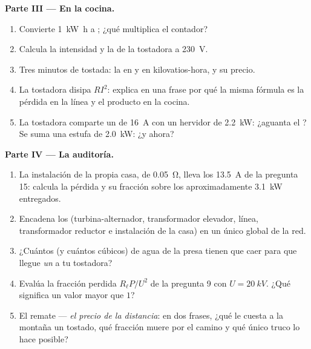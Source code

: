 \begin{problem}
\medskip
\noindent\textbf{Parte III --- En la cocina.}
\begin{enumerate}[resume]
  \item Convierte \qty{1}{kW.h} a ; ¿qué multiplica el contador?
  \item Calcula la intensidad y la  de la tostadora a
        \qty{230}{V}.
  \item Tres minutos de tostada: la  en  y en
        kilovatios-hora, y su precio.
  \item La tostadora disipa $RI^2$: explica en una frase por qué la
        misma fórmula es la pérdida en la línea y el producto en la
        cocina.
  \item La tostadora comparte un  de \qty{16}{A} con un hervidor
        de \qty{2.2}{kW}: ¿aguanta el ? Se suma una estufa de
        \qty{2.0}{kW}: ¿y ahora?
\end{enumerate}

\medskip
\noindent\textbf{Parte IV --- La auditoría.}
\begin{enumerate}[resume]
  \item La instalación de la propia casa, de 
        \qty{0.05}{\ohm}, lleva los \qty{13.5}{A} de la pregunta 15:
        calcula la pérdida y su fracción sobre los aproximadamente
        \qty{3.1}{kW} entregados.
  \item Encadena los  (turbina-alternador, transformador
        elevador, línea, transformador reductor e instalación de la
        casa) en un único  global de la red.
  \item ¿Cuántos  (y cuántos  cúbicos) de agua de la
        presa tienen que caer para que llegue \emph{un}  a
        tu tostadora?
  \item Evalúa la fracción perdida $R_\ell P/U^2$ de la pregunta 9 con
        $U = \qty{20}{kV}$. ¿Qué significa un valor mayor que $1$?
  \item El remate --- \emph{el precio de la distancia}: en dos frases,
        ¿qué le cuesta a la montaña un  tostado, qué
        fracción muere por el camino y qué único truco lo hace posible?
\end{enumerate}
\end{problem}
